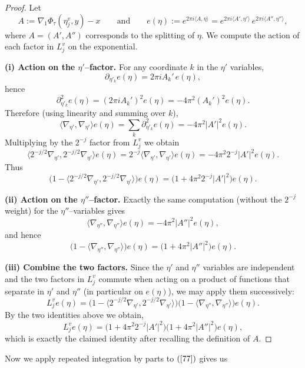 \documentclass[12pt, reqno]{amsart}
\theoremstyle{definition}
\theoremstyle{remark}
\numberwithin{equation}{section}
\begin{document}
\begin{proof}
Let
\[
A:=\nabla_1\Phi_\tau(\eta_j^v,y)-x
\qquad\text{and}\qquad
e(\eta):=e^{2\pi i\langle A,\eta\rangle}
= e^{2\pi i\langle A',\eta'\rangle}\,e^{2\pi i\langle A'',\eta''\rangle},
\]
where $A=(A',A'')$ corresponds to the splitting of $\eta$. We compute the action of each factor in $L_j^v$ on the exponential.

\medskip\noindent\textbf{(i) Action on the $\eta'$--factor.}
For any coordinate $k$ in the $\eta'$ variables,
\[
\partial_{\eta'_k} e(\eta) = 2\pi i A_k' \, e(\eta),
\]
hence
\[
\partial_{\eta'_k}^2 e(\eta) = (2\pi i A_k')^2 e(\eta) = -4\pi^2 (A_k')^2 e(\eta).
\]
Therefore (using linearity and summing over $k$),
\[
\langle \nabla_{\eta'},\nabla_{\eta'}\rangle e(\eta)
= \sum_{k} \partial_{\eta'_k}^2 e(\eta)
= -4\pi^2 |A'|^2 e(\eta).
\]
Multiplying by the $2^{-j}$ factor from $L_j^v$ we obtain
\[
\langle 2^{-j/2}\nabla_{\eta'},2^{-j/2}\nabla_{\eta'}\rangle e(\eta)
= 2^{-j} \langle \nabla_{\eta'},\nabla_{\eta'}\rangle e(\eta)
= -4\pi^2 2^{-j} |A'|^2 e(\eta).
\]
Thus
\[
\big(1 - \langle 2^{-j/2}\nabla_{\eta'},2^{-j/2}\nabla_{\eta'}\rangle\big) e(\eta)
= \big(1 + 4\pi^2 2^{-j} |A'|^2\big) e(\eta).
\]

\medskip\noindent\textbf{(ii) Action on the $\eta''$--factor.}
Exactly the same computation (without the $2^{-j}$ weight) for the $\eta''$--variables gives
\[
\langle \nabla_{\eta''},\nabla_{\eta''}\rangle e(\eta)
= -4\pi^2 |A''|^2 e(\eta),
\]
and hence
\[
\big(1 - \langle \nabla_{\eta''},\nabla_{\eta''}\rangle\big) e(\eta)
= \big(1 + 4\pi^2 |A''|^2\big) e(\eta).
\]

\medskip\noindent\textbf{(iii) Combine the two factors.}
Since the $\eta'$ and $\eta''$ variables are independent and the two factors
in $L_j^v$ commute when acting on a product of functions that separate in
$\eta'$ and $\eta''$ (in particular on $e(\eta)$), we may apply them successively:
\[
L_j^v e(\eta)
= \big(1 - \langle 2^{-j/2}\nabla_{\eta'},2^{-j/2}\nabla_{\eta'}\rangle\big)
  \big(1 - \langle \nabla_{\eta''},\nabla_{\eta''}\rangle\big)
  e(\eta).
\]
By the two identities above we obtain,
\[ L_j^v e(\eta)=
\big(1 + 4\pi^2 2^{-j} |A'|^2\big)\big(1 + 4\pi^2 |A''|^2\big) e(\eta),
\]
which is exactly the claimed identity after recalling the definition of $A$.
\end{proof}
Now we apply repeated integration by parts to $(\ref{77})$ gives us
\end{document}
